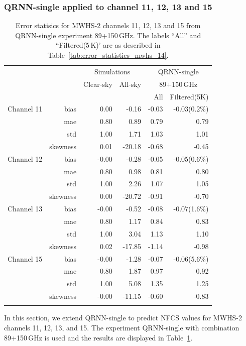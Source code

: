 \documentclass[amt, manuscript]{copernicus}
\begin{document}
\subsubsection{QRNN-single applied to channel 11, 12, 13 and 15}
\label{sec:mwhs_others}
\begin{table}[t]
	\caption{ Error statisics for MWHS-2 channels 11, 12, 13 and 15 from QRNN-single experiment 89+150\,GHz. The labels ``All'' and ``Filtered(5\,K)' are as described in Table~\ref{tab:error_statistics_mwhs_14}.}
	\label{tab:error_statistics_mwhs_others}
	\begin{tabular}{lrrr|rr}
		\tophline
		&&\multicolumn{2}{c|}{Simulations}& \multicolumn{2}{c}{QRNN-single} \\
		\cline{2-6}
		& &  Clear-sky &   All-sky &  \multicolumn{2}{c}{89+150\,GHz}  \\
		&	&		   &			& All & Filtered(5K)\\
		\middlehline
		Channel 11  &   bias     & 0.00 &  -0.16 & -0.03 & -0.03(0.2\%)  \\
				    &	mae      & 0.80 &   0.89 &  0.79 &  0.79  \\
					&	std      & 1.00 &   1.71 &  1.03 &  1.01  \\
					&	skewness & 0.01 & -20.18 & -0.68 & -0.45  \\
		\middlehline
		Channel 12  & bias     & -0.00 &  -0.28 & -0.05 & -0.05(0.6\%)  \\
					& mae      &  0.80 &   0.98 &  0.81 &  0.80  \\
					& std      &  1.00 &   2.26 &  1.07 &  1.05  \\
					& skewness &  0.00 & -20.72 & -0.91 & -0.70  \\
		\middlehline
		Channel 13  & bias     & -0.00 &  -0.52 & -0.08 & -0.07(1.6\%)  \\
					& mae      &  0.80 &   1.17 &  0.84 &  0.83  \\
					& std      &  1.00 &   3.04 &  1.13 &  1.10  \\
					& skewness &  0.02 & -17.85 & -1.14 & -0.98 \\		
		\middlehline
		Channel 15  & bias     & -0.00 &  -1.28 & -0.07 & -0.06(5.6\%)  \\
					& mae      &  0.80 &   1.87 &  0.97 &  0.92 \\
					& std      &  1.00 &   5.08 &  1.35 &  1.25 \\
					& skewness & -0.00 & -11.15 & -0.60 & -0.83  \\ 
		\bottomhline
	\end{tabular}
\end{table}
In this section, we extend QRNN-single to predict NFCS values for MWHS-2 channels 11, 12, 13, and 15. The experiment QRNN-single with combination 89+150\,GHz is used and the results are displayed in  Table~\ref{tab:error_statistics_mwhs_others}.
\end{document}
